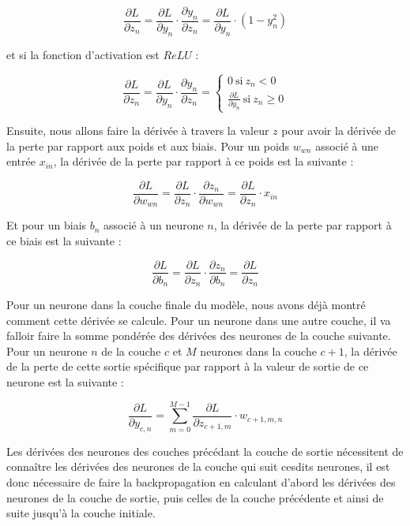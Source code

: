 \documentclass{article}
\begin{document}
\[
\frac{\partial L}{\partial z_n} = \frac{\partial L}{\partial y_n} \cdot \frac{\partial y_n}{\partial z_n} = \frac{\partial L}{\partial y_n} \cdot (1 - y_n^2)
\]

et si la fonction d'activation est $ReLU$ :

\[
\frac{\partial L}{\partial z_n} = \frac{\partial L}{\partial y_n} \cdot \frac{\partial y_n}{\partial z_n} =
\begin{cases}
0 \ \text{si} \ z_n < 0 \\
\frac{\partial L}{\partial y_n} \ \text{si} \ z_n \geq 0
\end{cases}
\]


\medskip

Ensuite, nous allons faire la dérivée à travers la valeur $z$ pour avoir la dérivée de la perte par rapport aux poids et aux biais. Pour un poids $w_{wn}$ associé à une entrée $x_{in}$, la dérivée de la perte par rapport à ce poids est la suivante :

\[
\frac{\partial L}{\partial w_{wn}} = \frac{\partial L}{\partial z_n} \cdot \frac{\partial z_n}{\partial w_{wn}} = \frac{\partial L}{\partial z_n} \cdot x_{in}
\]

Et pour un biais $b_n$ associé à un neurone $n$, la dérivée de la perte par rapport à ce biais est la suivante :

\[
\frac{\partial L}{\partial b_n} = \frac{\partial L}{\partial z_n} \cdot \frac{\partial z_n}{\partial b_n} = \frac{\partial L}{\partial z_n}
\]

\medskip

Pour un neurone dans la couche finale du modèle, nous avons déjà montré comment cette dérivée se calcule. Pour un neurone dans une autre couche, il va falloir faire la somme pondérée des dérivées des neurones de la couche suivante. Pour un neurone $n$ de la couche $c$ et $M$ neurones dans la couche $c+1$, la dérivée de la perte de cette sortie spécifique par rapport à la valeur de sortie de ce neurone est la suivante :

\[
\frac{\partial L}{\partial y_{c,n}} = \sum_{m=0}^{M-1} \frac{\partial L}{\partial z_{c+1,m}} \cdot w_{c+1,m,n}
\]

Les dérivées des neurones des couches précédant la couche de sortie nécessitent de connaître les dérivées des neurones de la couche qui suit cesdits neurones, il est donc nécessaire de faire la backpropagation en calculant d'abord les dérivées des neurones de la couche de sortie, puis celles de la couche précédente et ainsi de suite jusqu'à la couche initiale.
\end{document}
